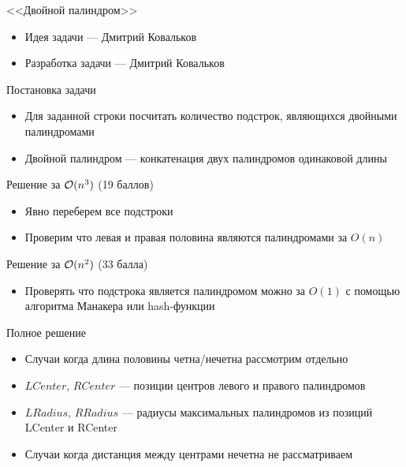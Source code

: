 \begin{frame}
  \begin{center}
    \LARGE <<Двойной палиндром>>
  \end{center}

  \begin{itemize}
  \item Идея задачи --- Дмитрий Ковальков
  \item Разработка задачи --- Дмитрий Ковальков
  \end{itemize}

\end{frame}

\begin{frame}{Постановка задачи}

  \begin{itemize}
    \item Для заданной строки посчитать количество подстрок, являющихся двойными палиндромами
    \item Двойной палиндром --- конкатенация двух палиндромов одинаковой длины
  \end{itemize}
  
\end{frame}

\begin{frame}{Решение за $\mathcal{O}(n^3)$ (19 баллов)}
  \begin{itemize}
  \item Явно переберем все подстроки
  \item Проверим что левая и правая половина являются палиндромами за $O(n)$
  \end{itemize}
\end{frame}

\begin{frame}{Решение за $\mathcal{O}(n^2)$ (33 балла)}
  \begin{itemize}
  \item Проверять что подстрока является палиндромом можно за $O(1)$ с помощью алгоритма Манакера или hash-функции
  \end{itemize}
\end{frame}

\begin{frame}{Полное решение}
  \begin{itemize}
    \item Случаи когда длина половины четна/нечетна рассмотрим отдельно
    \item $LCenter$, $RCenter$ --- позиции центров левого и правого палиндромов
    \item $LRadius$, $RRadius$ --- радиусы максимальных палиндромов из позиций LCenter и RCenter
    \item Случаи когда дистанция между центрами нечетна не рассматриваем
  \end{itemize}
\end{frame}

